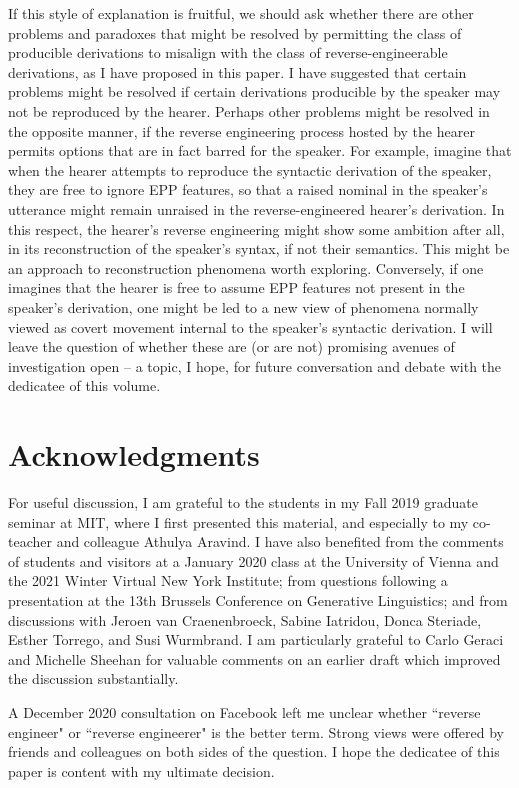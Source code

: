\documentclass[output=paper]{langscibook}
\begin{document}
If this style of explanation is fruitful, we should ask whether there are other problems and paradoxes that might be resolved by permitting the class of producible derivations to misalign with the class of reverse-engineerable derivations, as I have proposed in this paper. I have suggested that certain problems might be resolved if certain derivations producible by the speaker may not be reproduced by the hearer. Perhaps other problems might be resolved in the opposite manner, if the reverse engineering process hosted by the hearer permits options that are in fact barred for the speaker. For example, imagine that when the hearer attempts to reproduce the syntactic derivation of the speaker, they are free to ignore EPP features, so that a raised nominal in the speaker's utterance might remain unraised in the reverse-engineered hearer's derivation. In this respect, the hearer's reverse engineering might show some ambition after all, in its reconstruction of the speaker's syntax, if not their semantics. This might be an approach to reconstruction phenomena worth exploring. Conversely, if one imagines that the hearer is free to assume EPP features not present in the speaker's derivation, one might be led to a new view of phenomena normally viewed as covert movement internal to the speaker's syntactic derivation. I will leave the question of whether these are (or are not) promising avenues of investigation open -- a topic, I hope, for future conversation and debate with the dedicatee of this volume.


\section*{Acknowledgments}
For useful discussion, I am grateful to the students in my Fall 2019 graduate seminar at MIT, where I first presented this material, and especially to my co-teacher and colleague Athulya Aravind.  I have also benefited from the comments of students and visitors at a January 2020 class at the University of Vienna and the 2021 Winter Virtual New York Institute; from questions following a presentation at the 13th Brussels Conference on Generative Linguistics; and from discussions with Jeroen van Craenenbroeck, Sabine Iatridou, Donca Steriade, Esther Torrego, and Susi Wurmbrand. I am particularly grateful to Carlo Geraci and Michelle Sheehan for valuable comments on an earlier draft which improved the discussion substantially. 

A December 2020 consultation on Facebook left me unclear whether ``reverse engineer" or ``reverse engineerer" is the better term.  Strong views were offered by friends and colleagues on both sides of the question.  I hope the dedicatee of this paper is content with my ultimate decision.

{\sloppy\printbibliography[heading=subbibliography,notkeyword=this]}
\end{document}
